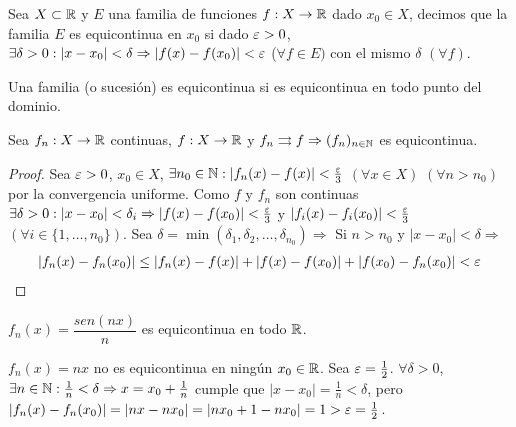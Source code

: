 \begin{definition}[Equicontinuidad]
  Sea \(X \subset \mathbb{R} \) y \(E\) una familia de funciones \(f: X \to \mathbb{R} \) dado \(x_0 \in X\), decimos que la familia \(E\) es equicontinua en \(x_0\) si dado \(\varepsilon > 0\), \(\exists \delta > 0 : |x - x_0| < \delta \Rightarrow |f(x) - f(x_0)| < \varepsilon \) (\(\forall f \in E)\) con el mismo \(\delta \) \((\forall f)\).
\end{definition}

Una familia (o sucesión) es equicontinua si es equicontinua en todo punto del dominio.

\begin{theorem}
  Sea \(f_n: X \to \mathbb{R} \) continuas, \(f: X \to \mathbb{R} \) y \(f_n \rightrightarrows f \Rightarrow (f_n)_{n \in \mathbb{N}} \) es equicontinua.
  \begin{proof}
    Sea \(\varepsilon > 0\), \(x_0 \in X\), \(\exists n_0 \in \mathbb{N} : |f_n(x) - f(x)| < \frac{\varepsilon}{3} \) \((\forall x \in X)\) \((\forall n > n_0)\) por la convergencia uniforme.
    Como \(f\) y \(f_n\) son continuas \(\exists \delta > 0 : |x - x_0| < \delta_i \Rightarrow |f(x) - f(x_0)| < \frac{\varepsilon}{3} \) y \(|f_i(x) - f_i(x_0)| < \frac{\varepsilon}{3} \) \((\forall i \in \{1, \ldots, n_0\})\).
    Sea \(\delta = \min(\delta_1, \delta_2, \ldots, \delta_{n_0}) \Rightarrow \) Si \(n > n_0\) y \(|x - x_0| < \delta \Rightarrow \) \begin{align*}
      |f_n(x) - f_n(x_0)| \leq |f_n(x) - f(x)| + |f(x) - f(x_0)| + |f(x_0) - f_n(x_0)| < \varepsilon
    \end{align*}
  \end{proof}
\end{theorem}

\begin{eg}
  \(f_n(x) = \dfrac{sen(nx)}{n} \) es equicontinua en todo \(\mathbb{R} \).
\end{eg}

\begin{eg}
  \(f_n(x) = nx\) no es equicontinua en ningún \(x_0 \in \mathbb{R} \). Sea \(\varepsilon = \frac{1}{2} \). \(\forall \delta > 0\), \(\exists n \in \mathbb{N} : \frac{1}{n} < \delta \Rightarrow x = x_0 + \frac{1}{n} \) cumple que
  \(|x - x_0| = \frac{1}{n} < \delta \), pero \(|f_n(x) - f_n(x_0)| = |nx - nx_0| = |n x_0 + 1 - n x_0| = 1 > \varepsilon = \frac{1}{2} \).
\end{eg}
